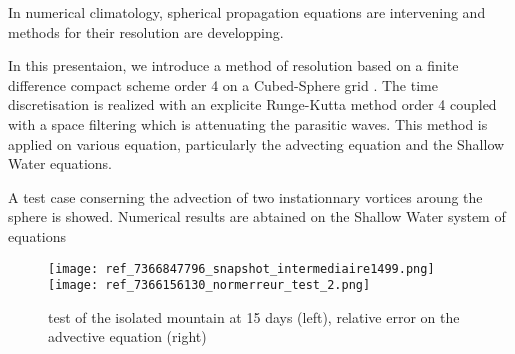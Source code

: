 \documentclass[10pt]{article}
\begin{document}
In numerical climatology, spherical propagation equations are intervening and methods for their resolution are developping.

In this presentaion, we introduce a method of resolution based on a finite difference compact scheme order 4 \cite{Lele1991} on a Cubed-Sphere grid \cite{Ronchi1996}. The time discretisation is realized with an explicite Runge-Kutta method order 4 coupled with a space filtering which is attenuating the parasitic waves. This method is applied on various equation, particularly the advecting equation and the Shallow Water equations.

A test case conserning the advection of two instationnary vortices aroung the sphere \cite{Nair2008} is showed. Numerical results are abtained on the Shallow Water system of equations \cite{Williamson1992}

\begin{figure}[ht]
\begin{center}
\texttt{[image: ref\_7366847796\_snapshot\_intermediaire1499.png]}
\texttt{[image: ref\_7366156130\_normerreur\_test\_2.png]}
\end{center}
\caption{test of the isolated mountain \cite{Williamson1992} at 15 days (left), relative error on the advective equation \cite{Nair2008} (right)}
\end{figure}
\end{document}
